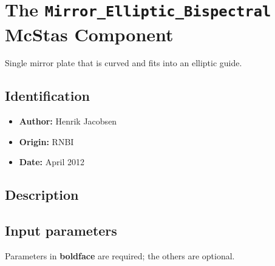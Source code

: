 \section{The \texttt{Mirror\_Elliptic\_Bispectral} McStas Component}
Single mirror plate that is curved and fits into an elliptic guide.

\subsection*{Identification}
\begin{itemize}
  \item \textbf{Author:} Henrik Jacobsen
  \item \textbf{Origin:} RNBI
  \item \textbf{Date:} April 2012
\end{itemize}

\subsection*{Description}


\subsection*{Input parameters}
Parameters in \textbf{boldface} are required; the others are optional.

